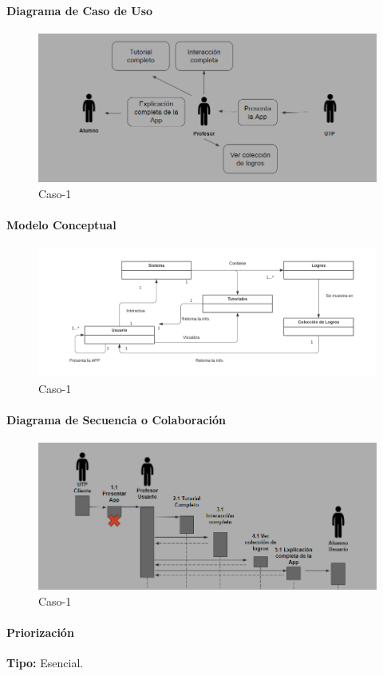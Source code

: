 \paragraph{Diagrama de Caso de Uso}

\begin{figure}[H]
\centerline{\includegraphics[width=15cm]{imgs/CasoUso_8.PNG}}
\caption{Caso-1}
\label{fig}
\end{figure}

\paragraph{Modelo Conceptual}

\begin{figure}[H]
\centerline{\includegraphics[width=15cm]{imgs/ModeloConceptualCaso_8_3.png}}
\caption{Caso-1}
\label{fig}
\end{figure}

\paragraph{Diagrama de Secuencia o Colaboración}

\begin{figure}[H]
\centerline{\includegraphics[width=15cm]{imgs/CasoUso_8_2.PNG}}
\caption{Caso-1}
\label{fig}
\end{figure}

\paragraph{Priorización}
{\textbf {Tipo:}}
Esencial.